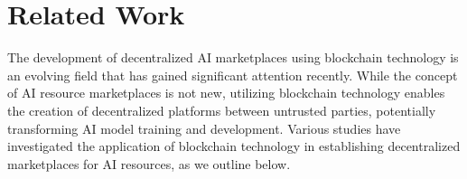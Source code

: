 \documentclass{ledger}
\begin{document}



\section{Related Work}

The development of decentralized AI marketplaces using blockchain technology is an evolving field that has gained significant attention recently. While the concept of AI resource marketplaces is not new, utilizing blockchain technology enables the creation of decentralized platforms between untrusted parties, potentially transforming AI model training and development.
%
Various studies have investigated the application of blockchain technology in establishing decentralized marketplaces for AI resources, as we outline below.


\end{document}
